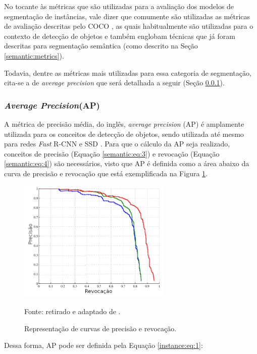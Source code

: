 No tocante às métricas que são utilizadas para a avaliação dos modelos de segmentação de instâncias, vale dizer que comumente são utilizadas as métricas de avaliação descritas pelo COCO \cite{Lin2016}, as quais habitualmente são utilizadas para o contexto de detecção de objetos e também englobam técnicas que já foram descritas para segmentação semântica (como descrito na Seção \ref{semantic:metrics}).

Todavia, dentre as métricas mais utilizadas para essa categoria de segmentação, cita-se a de \textit{average precision} que será detalhada a seguir (Seção \ref{instance:AP}).


\subsubsection{\textit{Average Precision}(AP)}
\label{instance:AP}

A métrica de precisão média, do inglês, \textit{average precision} (AP) é amplamente utilizada para os conceitos de detecção de objetos, sendo utilizada até mesmo para redes \textit{Fast} R-CNN \cite{Girshick2014} e SSD \cite{Liu2015a}. Para que o cálculo da AP seja realizado, conceitos de precisão (Equação \ref{semantic:eq:3}) e revocação (Equação \ref{semantic:eq:4}) são necessários, visto que AP é definida como a área abaixo da curva de precisão e revocação \cite{Hariharan2014} que está exemplificada na Figura \ref{instance:fig:1}.

\begin{figure}[H]
    \centering
    \caption{Representação de curvas de precisão e revocação.}
    \includegraphics[height=2.3in]{recursos/imagens/instance/prec_revo.png}
    \label{instance:fig:1}

    \vspace*{1 cm}
    Fonte: retirado e adaptado de \cite{Hariharan2014}.
\end{figure}

Dessa forma, AP pode ser definida pela Equação \ref{instance:eq:1}:


